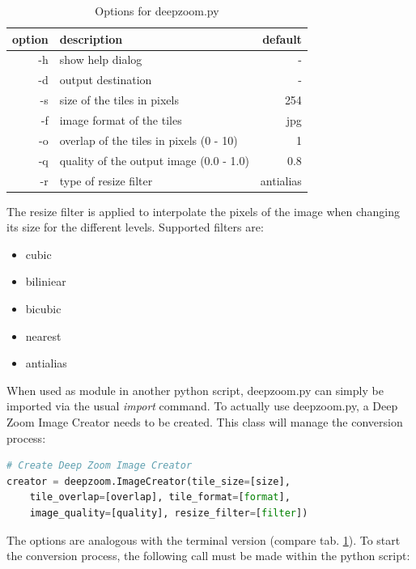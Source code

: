 \begin{table}[H]
	\begin{center}
		\begin{tabular}{| r | l | r |}
			\hline
			\textbf{option} & \textbf{description} & \textbf{default} \\ \hline
			-h & show help dialog & - \\ \hline
			-d & output destination & - \\ \hline
			-s & size of the tiles in pixels & 254 \\ \hline
			-f & image format of the tiles & jpg\\ \hline
			-o & overlap of the tiles in pixels (0 - 10) & 1 \\ \hline
			-q & quality of the output image (0.0 - 1.0) & 0.8 \\ \hline
			-r & type of resize filter & antialias \\ \hline
		\end{tabular}
		\caption{Options for deepzoom.py}
		\label{tab3_deepzoomParams}
	\end{center}
\end{table}

The resize filter is applied to interpolate the pixels of the image when changing its size for the different levels. Supported filters are:

\begin{itemize}
	\item cubic
	\item biliniear
	\item bicubic
	\item nearest
	\item antialias
\end{itemize}

When used as module in another python script, deepzoom.py can simply be imported via the usual \emph{import} command. To actually use deepzoom.py, a Deep Zoom Image Creator needs to be created. This class will manage the conversion process:

\begin{lstlisting}[frame=single, language=python]
# Create Deep Zoom Image Creator
creator = deepzoom.ImageCreator(tile_size=[size], 
	tile_overlap=[overlap],	tile_format=[format], 
	image_quality=[quality], resize_filter=[filter])
\end{lstlisting}

The options are analogous with the terminal version (compare tab. \ref{tab3_deepzoomParams}). To start the conversion process, the following call must be made within the python script:

